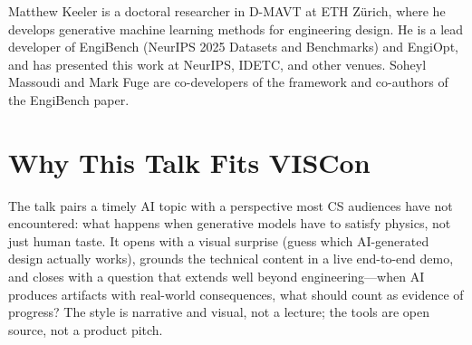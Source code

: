 \documentclass[11pt,a4paper]{article}
\begin{document}
Matthew Keeler is a doctoral researcher in D-MAVT at ETH Z\"urich, where he develops generative machine learning methods for engineering design. He is a lead developer of EngiBench (NeurIPS 2025 Datasets and Benchmarks) and EngiOpt, and has presented this work at NeurIPS, IDETC, and other venues. Soheyl Massoudi and Mark Fuge are co-developers of the framework and co-authors of the EngiBench paper.

\section*{Why This Talk Fits VISCon}

The talk pairs a timely AI topic with a perspective most CS audiences have not encountered: what happens when generative models have to satisfy physics, not just human taste. It opens with a visual surprise (guess which AI-generated design actually works), grounds the technical content in a live end-to-end demo, and closes with a question that extends well beyond engineering---when AI produces artifacts with real-world consequences, what should count as evidence of progress? The style is narrative and visual, not a lecture; the tools are open source, not a product pitch.
\end{document}
